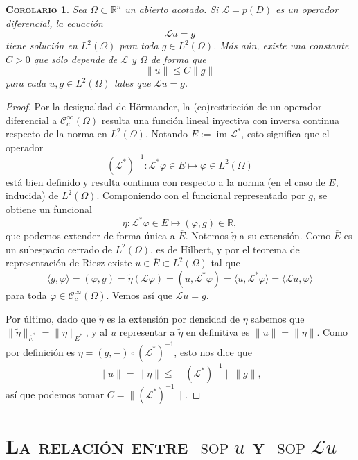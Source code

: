 \documentclass[11pt]{article}
\theoremstyle{colored}
\DeclareMathOperator{\sop}{sop}
\newtheorem{corollary}{\scshape Corolario}
\newcommand{\R}{\mathbb{R}}
\newcommand{\C}{\mathscr{C}}
\newcommand{\im}{\operatorname{im}}
\newcommand{\ev}[1]{\langle #1 \rangle}
\newcommand{\ip}[1]{( #1 )}
\renewcommand{\L}{\mathscr{L}}
\begin{document}
\begin{corollary} \label{sol-l2}Sea $\Omega \subset \R^n$ un abierto acotado. Si $\L = p(D)$ es un operador diferencial, la ecuación 
\[
\L u = g
\]
tiene solución en $L^2(\Omega)$ para toda $g \in L^2(\Omega)$. Más aún, existe una constante $C > 0$ que sólo depende de $\L$ y $\Omega$ de forma que
\[
\|u\| \leq C \|g\|
\]
para cada $u,g \in L^2(\Omega)$ tales que $\L u = g$.
\end{corollary}
\begin{proof} Por la desigualdad de Hörmander, la (co)restricción de un operador diferencial a $\C_c^\infty(\Omega)$ resulta una función lineal inyectiva con inversa continua respecto de la norma en $L^2(\Omega)$. Notando $E := \im \L^\ast$, esto significa que el operador
\[
(\L^\ast)^{-1} : \L^\ast \varphi \in E \mapsto \varphi \in L^2(\Omega)
\]
está bien definido y resulta continua con respecto a la norma (en el caso de $E$, inducida) de $L^2(\Omega)$. Componiendo con el funcional representado por $g$, se obtiene un funcional
\[
\eta  : \L^\ast\varphi \in E \mapsto \ip{\varphi, g} \in \R,
\]
que podemos extender de forma única a $\overline{E}$. Notemos $\widetilde{\eta}$ a su extensión. Como $\overline{E}$ es un subespacio cerrado de $L^2(\Omega)$, es de Hilbert, y por el teorema de representación de Riesz existe $u \in \overline{E} \subset L^2(\Omega)$ tal que
\[
\ev{g,\varphi} = (\varphi,g) = \widetilde{\eta}(\L\varphi) = (u,\L^\ast\varphi) = \ev{u,\L^\ast\varphi} = \ev{\L u, \varphi}
\]
para toda $\varphi \in \C_c^\infty(\Omega)$. Vemos así que $\L u = g$. 

Por último, dado que $\widetilde{\eta}$ es la extensión por densidad de $\eta$ sabemos que $\|\widetilde{\eta}\|_{\overline{E}^\ast} = \|\eta\|_{E^\ast}$, y al $u$ representar a $\widetilde{\eta}$ en definitiva es $\|u\| = \|\eta\|$. Como por definición es $\eta = (g,-) \circ (\L^\ast)^{-1}$, esto nos dice que
\[
\|u\| = \|\eta\| \leq \|(\L^\ast)^{-1}\| \|g\|,
\]
así que podemos tomar $C = \|(\L^\ast)^{-1}\|$.
\end{proof}

\section{\scshape La relación entre $\sop u$ y $\sop \L u$}
\end{document}

